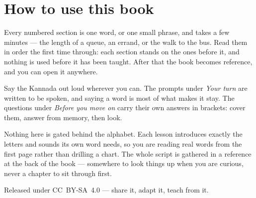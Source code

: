 \documentclass[11pt,twoside]{book}
\begin{document}
\section*{How to use this book}

Every numbered section is one word, or one small phrase, and takes a few
minutes --- the length of a queue, an errand, or the walk to the bus. Read them
in order the first time through: each section stands on the ones before it, and
nothing is used before it has been taught. After that the book becomes
reference, and you can open it anywhere.

Say the Kannada out loud wherever you can. The prompts under \emph{Your turn}
are written to be spoken, and saying a word is most of what makes it stay. The
questions under \emph{Before you move on} carry their own answers in brackets:
cover them, answer from memory, then look.

Nothing here is gated behind the alphabet. Each lesson introduces exactly the
letters and sounds its own word needs, so you are reading real words from the
first page rather than drilling a chart. The whole script is gathered in a
reference at the back of the book --- somewhere to look things up when you are
curious, never a chapter to sit through first.

Released under CC~BY-SA~4.0 --- share it, adapt it, teach from it.

\tableofcontents

\mainmatter


\end{document}
